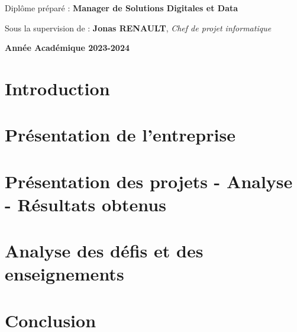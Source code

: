 \documentclass[a4paper, oneside, 12pt, final]{extreport}
\newcommand{\AU} {
\centering \textbf{Année Académique 2023-2024}
}
\begin{document}
\begin{titlepage}
\begin{center}
    \vspace{30pt}
    {Diplôme préparé : \textbf{\large Manager de Solutions Digitales et Data}}\\
    \vspace{46pt}

    Sous la supervision de :  \textbf{Jonas RENAULT}, \textit{Chef de projet informatique}\\
    \vspace{50pt}

  \end{center}
  \vspace{30pt}
  \AU\\
\end{titlepage}



\tableofcontents
{}

\listoffigures


\cleardoublepage

\newpage
{}
\chapter*{Introduction}
\label{chap:general_intorduction}



\chapter{Présentation de l'entreprise}
\label{chap:chapterone}


\chapter{Présentation des projets - Analyse - Résultats obtenus}
\label{chap:2}


\chapter{Analyse des défis et des enseignements}
\label{chap:3}


\chapter*{Conclusion}
\label{chap:conclusion}


\appendix
\newpage
\renewcommand{\thepage}{\Alph{page}}


\nocite{*}






\cleardoublepage%

\end{document}
